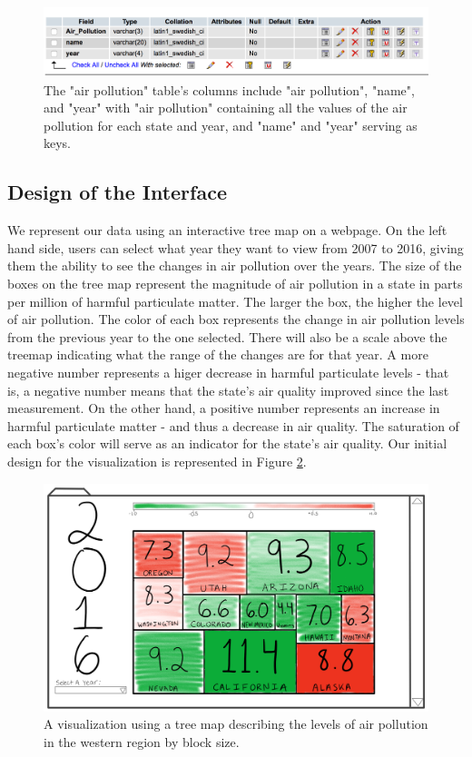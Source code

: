 \documentclass[journal]{vgtc}                %
\begin{document}
\begin{figure}
\centering
\includegraphics[width=\columnwidth]{air_poll_db}
\caption{The "air pollution" table's columns include "air pollution", "name", and "year" with "air pollution" 
containing all the values of the air pollution for each state and year, and "name" and "year" serving as keys.}
\label{fig:airPoll}
\end{figure}

\subsection{Design of the Interface}

We represent our data using an interactive tree map on a webpage. On the left hand side, users can select what year 
they want to view from 2007 to 2016, giving them the ability to see the changes in air pollution over the years. The 
size of the boxes on the tree map represent the magnitude of air pollution in a state in parts per million of harmful particulate matter. The larger the 
box, the higher the level of air pollution. The color of each box represents the change in air pollution levels from the previous 
year to the one selected. There will also be a scale above the treemap indicating what the range of the changes are for that year. 
A more negative number represents a higer decrease in harmful particulate levels - that is, a negative number means
that the state's air quality improved since the last measurement. On the other hand, a positive number represents an increase in harmful
particulate matter - and thus a decrease in air quality. The saturation of each box's color will serve as an indicator for the state's 
air quality. Our initial design for the visualization is represented in Figure \ref{fig:Design}.

\begin{figure}
\centering
\includegraphics[width=\columnwidth]{HW1Design}
\caption{A visualization using a tree map describing the levels of air pollution in the western region by block size.}
\label{fig:Design}
\end{figure}
\end{document}
